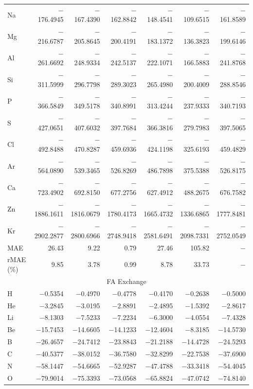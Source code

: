 \documentclass[%
 reprint,
 amsmath,amssymb,
 aps,
pra,
]{revtex4-2}
\begin{document}
\begin{table}[t]
\begin{ruledtabular}
\begin{tabular}{lrrrrrr}
Na & $-$176.4945 & $-$167.4390 & $-$162.8842 & $-$148.4541 & $-$109.6515 & $-$161.8589 \\
Mg & $-$216.6787 & $-$205.8645 & $-$200.4191 & $-$183.1372 & $-$136.3823 & $-$199.6146 \\
Al & $-$261.6692 & $-$248.9334 & $-$242.5137 & $-$222.1071 & $-$166.5883 & $-$241.8768 \\
Si & $-$311.5999 & $-$296.7798 & $-$289.3023 & $-$265.4980 & $-$200.4009 & $-$288.8546 \\
P  & $-$366.5849 & $-$349.5178 & $-$340.8991 & $-$313.4244 & $-$237.9333 & $-$340.7193 \\
S  & $-$427.0651 & $-$407.6032 & $-$397.7684 & $-$366.3816 & $-$279.7983 & $-$397.5065 \\
Cl & $-$492.8488 & $-$470.8287 & $-$459.6936 & $-$424.1198 & $-$325.6193 & $-$459.4829 \\
Ar & $-$564.0890 & $-$539.3465 & $-$526.8269 & $-$486.7898 & $-$375.5388 & $-$526.8175 \\
Ca & $-$723.4902 & $-$692.8150 & $-$677.2756 & $-$627.4912 & $-$488.2675 & $-$676.7582 \\
Zn & $-$1886.1611 & $-$1816.0679 & $-$1780.4173 & $-$1665.4732 & $-$1336.6865 & $-$1777.8481 \\
Kr & $-$2902.2877 & $-$2800.6966 & $-$2748.9418 & $-$2581.6491 & $-$2098.7331 & $-$2752.0549 \\
\hline
MAE & 26.43 & 9.22 & 0.79 & 27.46 & 105.82 & $-$ \\
rMAE (\%) & 9.85 & 3.78 & 0.99 & 8.78 & 33.73 & $-$ \\
\hline
\multicolumn{7}{c}{FA Exchange} \\
\hline
H  & $-$0.5354 & $-$0.4970 & $-$0.4778 & $-$0.4170 & $-$0.2638 & $-$0.5000 \\
He & $-$3.2845 & $-$3.0195 & $-$2.8891 & $-$2.4895 & $-$1.5392 & $-$2.8617 \\
Li & $-$8.1303 & $-$7.5233 & $-$7.2234 & $-$6.3000 & $-$4.0554 & $-$7.4328 \\
Be & $-$15.7453 & $-$14.6605 & $-$14.1233 & $-$12.4604 & $-$8.3185 & $-$14.5730 \\
B  & $-$26.4657 & $-$24.7412 & $-$23.8843 & $-$21.2188 & $-$14.4728 & $-$24.5293 \\
C  & $-$40.5377 & $-$38.0152 & $-$36.7580 & $-$32.8299 & $-$22.7538 & $-$37.6900 \\
N  & $-$58.1447 & $-$54.6665 & $-$52.9287 & $-$47.4788 & $-$33.3418 & $-$54.4045 \\
O  & $-$79.9014 & $-$75.3393 & $-$73.0568 & $-$65.8824 & $-$47.0742 & $-$74.8140 \\

\end{tabular}
\end{ruledtabular}
\end{table}
\end{document}
